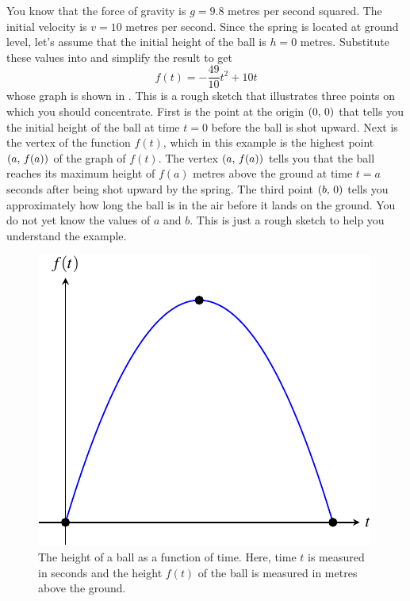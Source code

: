 \documentclass[a4paper,oneside,12pt]{article}
\begin{document}
\begin{solution}
You know that the force of gravity is $g = 9.8$ metres per second
squared.  The initial velocity is $v = 10$ metres per second.  Since
the spring is located at ground level, let's assume that the initial
height of the ball is $h = 0$ metres.  Substitute these values into
 and simplify the
result to get
\[
f(t)
=
-\frac{49}{10}t^2 + 10t
\]
whose graph is shown in .  This is a
rough sketch that illustrates three points on which you should
concentrate.  First is the point at the origin $\left\lparen{0},\, {0}\right\rparen$ that
tells you the initial height of the ball at time $t = 0$ before the
ball is shot upward.  Next is the vertex of the function $f(t)$, which
in this example is the highest point $\left\lparen{a},\, {f(a)}\right\rparen$ of the graph of
$f(t)$.  The vertex $\left\lparen{a},\, {f(a)}\right\rparen$ tells you that the ball reaches
its maximum height of $f(a)$ metres above the ground at time $t = a$
seconds after being shot upward by the spring.  The third point
$\left\lparen{b},\, {0}\right\rparen$ tells you approximately how long the ball is in the air
before it lands on the ground.  You do not yet know the values of $a$
and $b$.  This is just a rough sketch to help you understand the
example.

\begin{figure}[!htbp]
\centering
\includegraphics[scale=1]{image/09/spring-ball.pdf}
\caption{%
  The height of a ball as a function of time.  Here, time $t$ is
  measured in seconds and the height $f(t)$ of the ball is measured in
  metres above the ground.
}
\label{fig:spring_ball_graph}
\end{figure}


\end{solution}
\end{document}
